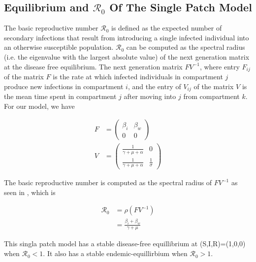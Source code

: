 \documentclass[12pt]{article}\usepackage[]{graphicx}\usepackage[]{color}
\begin{document}
\subsection{Equilibrium and {$\mathcal R_0$} Of The Single Patch Model}

The basic reproductive number ${\mathcal R_0}$ is defined as the expected number of secondary infections that result from introducing a single infected individual into an otherwise susceptible
population.
${\mathcal R_0}$ can be computed as the spectral radius (i.e. the eigenvalue with the largest absolute value) of the next generation matrix at the disease free equilibrium.
The next generation matrix $FV^{−1}$, where entry $F_{ij}$ of the matrix $F$ is the rate at which infected individuals in compartment $j$ produce new infections in compartment $i$, and the entry of $V_{ij}$ of the matrix $V$ is the mean time spent in compartment $j$ after moving into $j$ from compartment $k$.
For our model, we have
\begin{linenomath}
\begin{align*}
		F&=\begin{pmatrix}
			\beta_i & \beta_w\\
			0 & 0
			\end{pmatrix}\\
		V&=\begin{pmatrix}
			\frac{1}{\gamma+\mu+\alpha} & 0\\
			\frac{1}{\gamma+\mu+\alpha} &\frac{1}{\sigma}
			\end{pmatrix}
\end{align*}
\end{linenomath}
The basic reproductive number is computed as the spectral radius of $FV^{-1}$ as seen in \cite{link9}, which is
\begin{linenomath}
\begin{align*}
    {\mathcal R_0} &= \rho(FV^{-1})\\
		           &=\frac{\beta_i+\beta_w}{\gamma+\mu}
\end{align*}
\end{linenomath}
This singla patch model has a stable disease-free equillibrium at (S,I,R)=(1,0,0) when ${\mathcal R_0}<1$.
It also has a stable endemic-equillirbium when ${\mathcal R_0}>1$.

\end{document}
